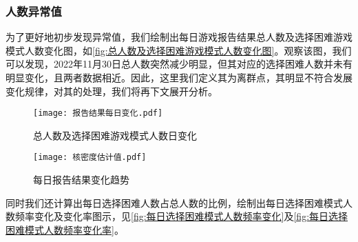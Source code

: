 \documentclass{MathModeling}
\begin{document}
	\subsubsection{人数异常值}
	为了更好地初步发现异常值，我们绘制出每日游戏报告结果总人数及选择困难游戏模式人数变化图，如\textcolor{blue}{\cref{fig:总人数及选择困难游戏模式人数变化图}}。观察该图，我们可以发现，2022年11月30日总人数突然减少明显，但其对应的选择困难人数并未有明显变化，且两者数据相近。因此，这里我们定义其为离群点，其明显不符合发展变化规律，对其的处理，我们将再下文展开分析。

	\begin{figure}[H]
		\centering
		\begin{minipage}{0.48\linewidth}
			\centering
			\texttt{[image: 报告结果每日变化.pdf]}
			\caption{总人数及选择困难游戏模式人数日变化}
			\label{fig:总人数及选择困难游戏模式人数变化图}
		\end{minipage}
		\begin{minipage}{0.48\linewidth}
			\centering
			\texttt{[image: 核密度估计值.pdf]}
			\caption{每日报告结果变化趋势}
			\label{fig:每日报告结果变化趋势}
		\end{minipage}
	\end{figure}

	同时我们还计算出每日选择困难人数占总人数的比例，绘制出每日选择困难模式人数频率变化及变化率图示，见\textcolor{blue}{\cref{fig:每日选择困难模式人数频率变化}}及\textcolor{blue}{\cref{fig:每日选择困难模式人数频率变化率}}。
\end{document}
